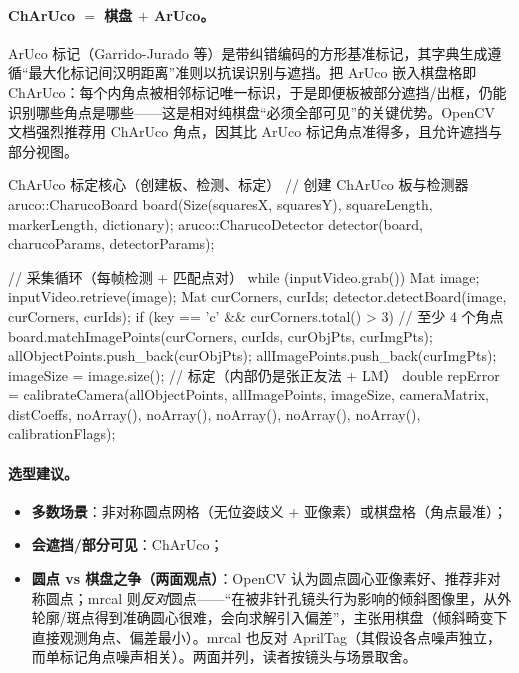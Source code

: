 \paragraph{ChArUco $=$ 棋盘 $+$ ArUco。}
ArUco 标记（Garrido-Jurado 等\cite{garrido2014aruco}）是带纠错编码的方形基准标记，其字典生成遵循“最大化标记间汉明距离”准则以抗误识别与遮挡。把 ArUco 嵌入棋盘格即 ChArUco：每个内角点被相邻标记唯一标识，于是即便板被部分遮挡/出框，仍能识别哪些角点是哪些——这是相对纯棋盘“必须全部可见”的关键优势。OpenCV 文档强烈推荐用 ChArUco 角点，因其比 ArUco 标记角点准得多，且允许遮挡与部分视图\cite{opencv2024charuco}。

\begin{codebox}[C++]{ChArUco 标定核心（创建板、检测、标定）}
// 创建 ChArUco 板与检测器
aruco::CharucoBoard board(Size(squaresX, squaresY), squareLength,
                          markerLength, dictionary);
aruco::CharucoDetector detector(board, charucoParams, detectorParams);

// 采集循环（每帧检测 + 匹配点对）
while (inputVideo.grab()) {
    Mat image; inputVideo.retrieve(image);
    Mat curCorners, curIds;
    detector.detectBoard(image, curCorners, curIds);
    if (key == 'c' && curCorners.total() > 3) {       // 至少 4 个角点
        board.matchImagePoints(curCorners, curIds, curObjPts, curImgPts);
        allObjectPoints.push_back(curObjPts);
        allImagePoints.push_back(curImgPts);
        imageSize = image.size();
    }
}
// 标定（内部仍是张正友法 + LM）
double repError = calibrateCamera(allObjectPoints, allImagePoints,
                                  imageSize, cameraMatrix, distCoeffs,
                                  noArray(), noArray(), noArray(),
                                  noArray(), noArray(), calibrationFlags);
\end{codebox}

\paragraph{选型建议。}
\begin{itemize}
  \item \textbf{多数场景}：非对称圆点网格（无位姿歧义 $+$ 亚像素）或棋盘格（角点最准）\cite{opencv2024pattern}；
  \item \textbf{会遮挡/部分可见}：ChArUco；
  \item \textbf{圆点 vs 棋盘之争（两面观点）}：OpenCV 认为圆点圆心亚像素好、推荐非对称圆点；mrcal\cite{kogan2024mrcal} 则\emph{反对}圆点——“在被非针孔镜头行为影响的倾斜图像里，从外轮廓/斑点得到准确圆心很难，会向求解引入偏差”，主张用棋盘（倾斜畸变下直接观测角点、偏差最小）。mrcal 也反对 AprilTag（其假设各点噪声独立，而单标记角点噪声相关）。两面并列，读者按镜头与场景取舍。
\end{itemize}

